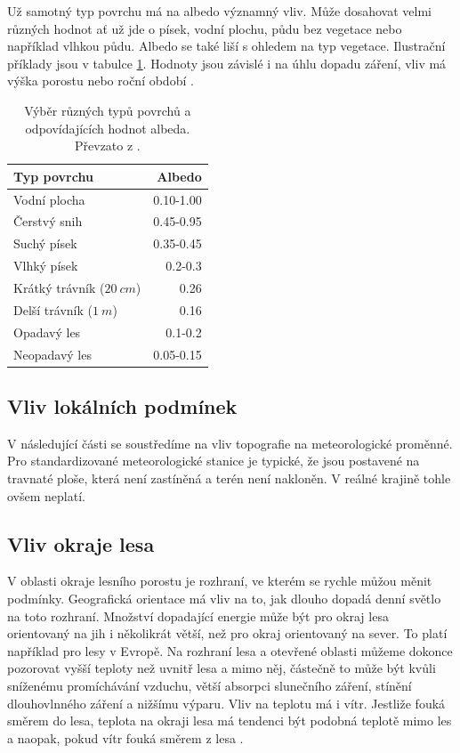 Už samotný typ povrchu má na albedo významný vliv. Může dosahovat velmi různých hodnot ať už jde o písek, vodní plochu, půdu bez vegetace nebo například vlhkou půdu. Albedo se také liší s ohledem na typ vegetace. Ilustrační příklady jsou v tabulce \ref{tab:albedo}. Hodnoty jsou závislé i na úhlu dopadu záření, vliv má výška porostu nebo roční období \parencite{arya2001,alma}.

\begin{table}
\centering\footnotesize\sf
\begin{tabular}{lr}
\toprule
Typ povrchu & Albedo \\
\midrule
Vodní plocha & 0.10-1.00 \\
Čerstvý snih & 0.45-0.95 \\
Suchý písek & 0.35-0.45\\
Vlhký písek & 0.2-0.3\\
Krátký trávník ($\SI{20}{cm}$) & 0.26\\
Delší trávník ($\SI{1}{m}$) & 0.16\\
Opadavý les & 0.1-0.2\\
Neopadavý les & 0.05-0.15\\
\bottomrule
\end{tabular}
	\caption{Výběr různých typů povrchů a odpovídajících hodnot albeda. Převzato z \cite{arya2001}.}
\label{tab:albedo}
\end{table}

\subsection{Vliv lokálních podmínek} \label{chap:topo}
V následující části se soustředíme na vliv topografie na meteorologické proměnné. Pro standardizované meteorologické stanice je typické, že jsou postavené na travnaté ploše, která není zastíněná a terén není nakloněn. V reálné krajině tohle ovšem neplatí.

\subsection{Vliv okraje lesa}
V oblasti okraje lesního porostu je rozhraní, ve kterém se rychle můžou měnit podmínky. Geografická orientace má vliv na to, jak dlouho dopadá denní světlo na toto rozhraní. Množství dopadající energie může být pro okraj lesa orientovaný na jih i několikrát větší, než pro okraj orientovaný na sever. To platí například pro lesy v Evropě. Na rozhraní lesa a otevřené oblasti můžeme dokonce pozorovat vyšší teploty než uvnitř lesa a mimo něj, částečně to může být kvůli sníženému promíchávání vzduchu, větší absorpci slunečního záření, stínění dlouhovlnného záření a nižšímu výparu. Vliv na teplotu má i vítr. Jestliže fouká směrem do lesa, teplota na okraji lesa má tendenci být podobná teplotě mimo les a naopak, pokud vítr fouká směrem z lesa \parencite{alma}.

